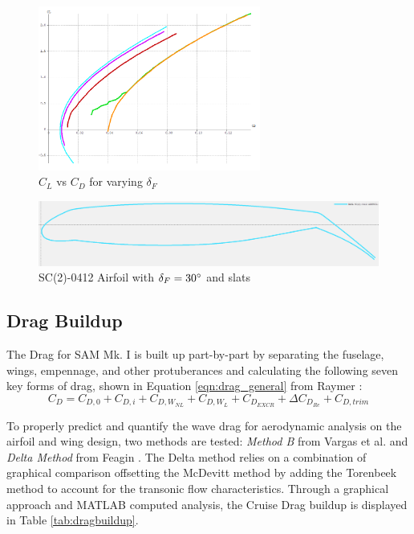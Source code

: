 \begin{figure}[!h]
    \centering
    \includegraphics[width=0.65\textwidth]{Photos/aero/CL_o_CD.png}
    \caption{$C_L$ vs $C_D$ for varying $\delta_F$}
    \label{fig:clcdhigh}
\end{figure}

\begin{figure}[!h]
    \centering
    \includegraphics[width=\textwidth]{Photos/aero/sc0412flapped.png}
    \caption{SC(2)-0412 Airfoil with $\delta_F = 30\degree$ and slats}
    \label{fig:highlift}
\end{figure}

\clearpage
\subsection{Drag Buildup}
The Drag for SAM Mk. I is built up part-by-part by separating the fuselage, wings, empennage, and other protuberances and calculating the following seven key forms of drag, shown in Equation \ref{eqn:drag_general} from Raymer \cite{raymer}:
\begin{equation}\label{eqn:drag_general}
    C_D = C_{D,0} + C_{D,i} + C_{D,W_{NL}} + C_{D,W_{L}} + C_{D_{EXCR}} + \Delta C_{D_{Re}} + C_{D,trim}
\end{equation}




To properly predict and quantify the wave drag for aerodynamic analysis on the airfoil and wing design, two methods are tested: \textit{Method B} from Vargas et al. \cite{vargas} and \textit{Delta Method} from Feagin \cite{deltaMethod}.  The Delta method relies on a combination of graphical comparison offsetting the McDevitt method \cite{mcdevitt} by adding the Torenbeek method \cite{torenbeek} to account for the transonic flow characteristics.  Through a graphical approach and MATLAB computed analysis, the Cruise Drag buildup is displayed in Table \ref{tab:dragbuildup}.

